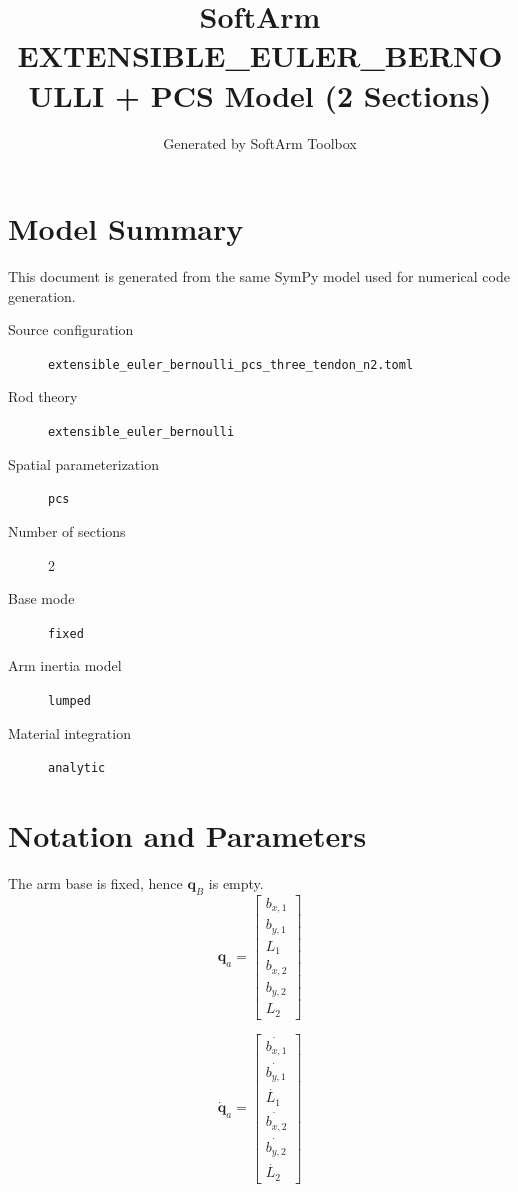 \documentclass[11pt]{article}
\title{SoftArm EXTENSIBLE\_EULER\_BERNOULLI + PCS Model (2 Sections)}
\author{Generated by SoftArm Toolbox}
\date{}
\begin{document}
\maketitle

\section{Model Summary}
This document is generated from the same SymPy model used for numerical code generation.
\begin{description}
\item[Source configuration] \texttt{extensible\_euler\_bernoulli\_pcs\_three\_tendon\_n2.toml}
\item[Rod theory] \texttt{extensible\_euler\_bernoulli}
\item[Spatial parameterization] \texttt{pcs}
\item[Number of sections] 2
\item[Base mode] \texttt{fixed}
\item[Arm inertia model] \texttt{lumped}
\item[Material integration] \texttt{analytic}
\end{description}

\section{Notation and Parameters}
The arm base is fixed, hence $\boldsymbol q_B$ is empty.
\begin{equation}
\boldsymbol q_a=\begin{bmatrix}b_{x,1}\\b_{y,1}\\L_{1}\\b_{x,2}\\b_{y,2}\\L_{2}\end{bmatrix}
\end{equation}

\begin{equation}
\dot{\boldsymbol q}_a=\begin{bmatrix}\dot{b_{x,1}}\\\dot{b_{y,1}}\\\dot{L_{1}}\\\dot{b_{x,2}}\\\dot{b_{y,2}}\\\dot{L_{2}}\end{bmatrix}
\end{equation}
\end{document}
